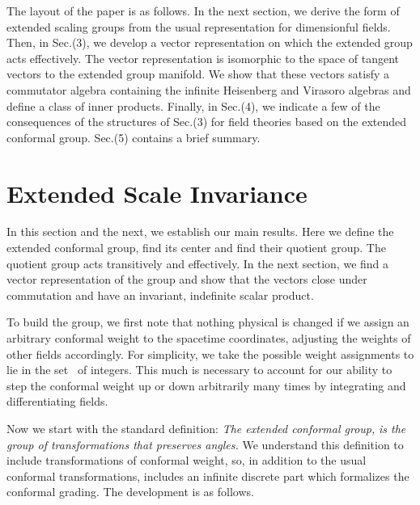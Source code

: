 \documentclass[a4paper,12pt]{article}
\begin{document}
\smallskip The layout of the paper is as follows. In the next section, we
derive the form of extended scaling groups from the usual representation for
dimensionful fields. Then, in Sec.(3), we develop a vector representation on
which the extended group acts effectively. The vector representation is
isomorphic to the space of tangent vectors to the extended group manifold.
We show that these vectors satisfy a commutator algebra containing the
infinite Heisenberg and Virasoro algebras and define a class of inner
products. Finally, in Sec.(4), we indicate a few of the consequences of the
structures of Sec.(3) for field theories based on the extended conformal
group. Sec.(5) contains a brief summary.

\section{Extended Scale Invariance}

In this section and the next, we establish our main results. Here we define
the extended conformal group, find its center and find their quotient group.
The quotient group acts transitively and effectively. In the next section,
we find a vector representation of the group and show that the vectors close
under commutation and have an invariant, indefinite scalar product.

To build the group, we first note that nothing physical is changed if we
assign an arbitrary conformal weight to the spacetime coordinates, adjusting
the weights of other fields accordingly. For simplicity, we take the
possible weight assignments to lie in the set \coordHE{}\ of integers. This much is
necessary to account for our ability to step the conformal weight up or down
arbitrarily many times by integrating and differentiating fields.

Now we start with the standard definition: \textit{The extended conformal
group, \coordHE{}} \textit{is the group of transformations that
preserves angles.} We understand this definition to include transformations
of conformal weight, so, in addition to the usual conformal transformations, 
\coordHE{} includes an infinite discrete part which formalizes the
conformal grading. The development is as follows.
\end{document}
